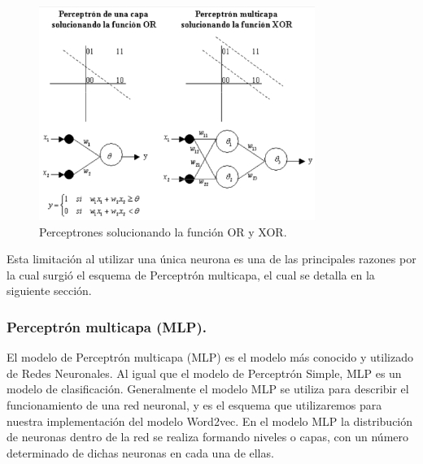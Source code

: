 \documentclass[12pt,a4paper]{article}
\begin{document}
\begin{sloppypar}
\begin{figure}[H]    %
 \centering
 \includegraphics[width=0.8\textwidth]{images/ANN/2-ANN.png}
 \caption[Perceptrones solucionando la función OR y XOR.]{Perceptrones solucionando la función OR y XOR\cite{ANN_24}.\protect\footnotemark}
 \label{fig:ann_2}
\end{figure}

Esta limitación al utilizar una única neurona es una de las principales razones por la cual surgió el esquema de Perceptrón multicapa, el cual se detalla en la siguiente sección.

\subsubsection{Perceptrón multicapa (MLP).}

El modelo de Perceptrón multicapa (MLP) es el modelo más conocido y utilizado de Redes Neuronales. Al igual que el modelo de Perceptrón Simple, MLP es un modelo de clasificación. Generalmente el modelo MLP se utiliza para describir el funcionamiento de una red neuronal, y es el esquema que utilizaremos para nuestra implementación del modelo Word2vec. En el modelo MLP la distribución de neuronas dentro de la red se realiza formando niveles o capas, con un número determinado de dichas neuronas en cada una de ellas. 


\end{sloppypar}
\end{document}
